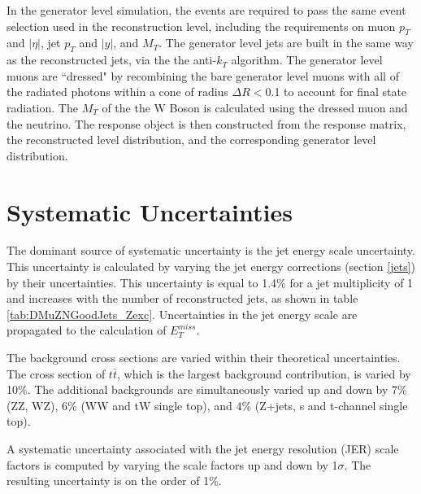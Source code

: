 \documentclass[oneside, letterpaper, oldfontcommands]{memoir}
\begin{document}
\qquad In the generator level simulation, the events are required to pass the same event selection used in the reconstruction level, including the requirements on muon $p_{T}$ and $|\eta|$, jet $p_{T}$ and $|y|$, and $M_{T}$. The generator level jets are built in the same way as the reconstructed jets, via the the anti-$k_{T}$ algorithm. The generator level muons are ``dressed" by recombining the bare generator level muons with all of the radiated photons within a cone of radius $\Delta R <$0.1 to account for final state radiation. The $M_{T}$ of the the W Boson is calculated using the dressed muon and the neutrino. The response object is then constructed from the response matrix, the reconstructed level distribution, and the corresponding generator level distribution. 

\section{Systematic Uncertainties}

\qquad The dominant source of systematic uncertainty is the jet energy scale uncertainty. This uncertainty is calculated by varying the jet energy corrections (section \ref{jets}) by their uncertainties. This uncertainty is equal to 1.4\% for a jet multiplicity of 1 and increases with the number of reconstructed jets, as shown in table \ref{tab:DMuZNGoodJets_Zexc}. Uncertainties in the jet energy scale are propagated to the calculation of $E_{T}^{miss}$.

\qquad The background cross sections are varied within their theoretical uncertainties. The cross section of $t\bar{t}$, which is the largest background contribution, is varied by 10\%. The additional backgrounds are simultaneously varied up and down by 7\% (ZZ, WZ), 6\% (WW and tW single top), and 4\% (Z+jets, s and t-channel single top). 


\qquad A systematic uncertainty associated with the jet energy resolution (JER) scale factors is computed by varying the scale factors up and down by 1$\sigma$. The resulting uncertainty is on the order of 1\%.
\end{document}
